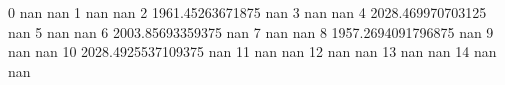 0 nan nan
1 nan nan
2 1961.45263671875 nan
3 nan nan
4 2028.469970703125 nan
5 nan nan
6 2003.85693359375 nan
7 nan nan
8 1957.2694091796875 nan
9 nan nan
10 2028.4925537109375 nan
11 nan nan
12 nan nan
13 nan nan
14 nan nan
